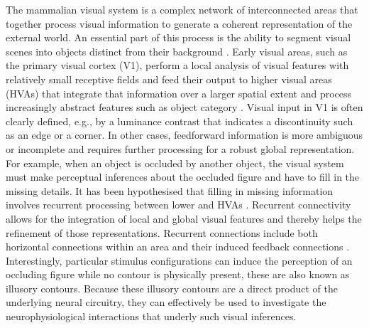\documentclass[12pt]{article}
\begin{document}
The mammalian visual system is a complex network of interconnected areas that together process visual information to generate a coherent representation of the external world. An essential part of this process is the ability to segment visual scenes into objects distinct from their background \autocite{kirchbergerEssentialRoleFeedback2020}. Early visual areas, such as the primary visual cortex (V1), perform a local analysis of visual features with relatively small receptive fields and feed their output to higher visual areas (HVAs) that integrate that information over a larger spatial extent and process increasingly abstract features such as object category \autocite{ashbridgeEffectImageOrientation2000}. Visual input in V1 is often clearly defined, e.g., by a luminance contrast that indicates a discontinuity such as an edge or a corner. In other cases, feedforward information is more ambiguous or incomplete and requires further processing for a robust global representation. For example, when an object is occluded by another object, the visual system must make perceptual inferences about the occluded figure and have to fill in the missing details. It has been hypothesised that filling in missing information involves recurrent processing between lower and HVAs \autocite{wyatteEarlyRecurrentFeedback2014}. Recurrent connectivity allows for the integration of local and global visual features and thereby helps the refinement of those representations. Recurrent connections include both horizontal connections within an area and their induced feedback connections \autocite{roelfsemaCORTICALALGORITHMSPERCEPTUAL2006,shushruthStrongRecurrentNetworks2012}. Interestingly, particular stimulus configurations can induce the perception of an occluding figure while no contour is physically present, these are also known as illusory contours. Because these illusory contours are a direct product of the underlying neural circuitry, they can effectively be used to investigate the neurophysiological interactions that underly such visual inferences.
\end{document}
